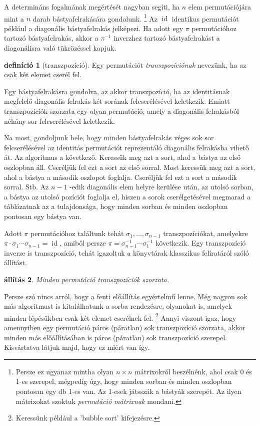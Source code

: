 \documentclass[a4paper, showtrims]{memoir}
\theoremstyle{plain}
\newtheorem{proposition}{állítás}[chapter]
\theoremstyle{remark}
\theoremstyle{definition}
\newtheorem{definition}[proposition]{definíció}
\DeclareMathOperator{\id}{id}
\begin{document}
A determináns fogalmának megértését nagyban segíti,
ha $n$ elem permutációjára mint a $n$ darab bástyafelrakására gondolunk.
\footnote{Persze ez ugyanaz mintha olyan $n\times n$ mátrixokról beszélnénk,
	ahol csak 0 és 1-es szerepel, mégpedig úgy, hogy minden sorban és minden oszlopban pontosan egy db 1-es van. Az 1-esek játsszák a bástyák szerepét. Az ilyen mátrixokat szoktuk \emph{permutáció mátrixnak} mondani.}
Az $\id$ identikus permutációt például a diagonális bástyafelrakás jelképezi.
Ha adott egy $\pi$ permutációhoz tartozó bástyafelrakás,
akkor a $\pi^{-1}$ inverzhez tartozó bástyafelrakást a diagonálisra való tükrözéssel kapjuk.
\begin{definition}[transzpozíció]
	Egy permutációt \emph{transzpozíciónak} nevezünk,
	ha az csak két elemet cserél fel.
\end{definition}
Egy bástyafelrakásra gondolva,
az akkor transzpozíció,
ha az identitásnak megfelelő diagonális felrakás két sorának felcserélésével keletkezik.
Emiatt transzpozíciók szorzata egy olyan permutáció,
amely a diagonális felrakásból néhány sor felcserélésével keletkezik.

Na most,
gondoljunk bele,
hogy minden bástyafelrakás véges sok sor felcserélésével az identitás permutációt reprezentáló diagonális felrakásba vihető át.
Az algoritmus a következő.
Keressük meg azt a sort,
ahol a bástya az első oszlopban áll.
Cseréljük fel ezt a sort az első sorral.
Most keressük meg azt a sort,
ahol a bástya a második oszlopot foglalja.
Cseréljük fel ezt a sort a második sorral.
Stb.
Az $n-1$ -edik diagonális elem helyre kerülése után, az utolsó sorban,
a bástya az utolsó pozíciót foglalja el,
hiszen a sorok cserélgetésével megmarad a táblázatnak az a tulajdonsága,
hogy minden sorban és minden oszlopban pontosan egy bástya van.

Adott $\pi$ permutációhoz találtunk tehát $\sigma_1,\ldots,\sigma_{n-1}$ transzpozíciókat,
amelyekre $\pi\cdot\sigma_1\cdots\sigma_{n-1}=\id$, amiből persze
$\pi=\sigma_{n-1}^{-1}\cdots\sigma_1^{-1}$ következik.
Egy transzpozíció inverze is transzpozíció, tehát igazoltuk a könyvtárak klasszikus felíratáról
szóló állítást.
\begin{proposition}
	Minden permutáció transzpozíciók szorzata.
\end{proposition}
Persze szó nincs arról, hogy a fenti előállítás egyértelmű lenne.
Még nagyon sok más algoritmust is kitalálhatunk a sorba rendezésre,
olyanokat is,
amelyek minden lépésükben csak két elemet cserélnek fel.%
\footnote{Keressünk például a 'bubble sort' kifejezésre.}
Annyi viszont igaz,
hogy amennyiben egy permutáció páros (páratlan) sok transzpozíció szorzata,
akkor minden más előállításában is páros (páratlan) sok transzpozíció szerepel.
Kisvártatva látjuk majd, hogy ez miért van így.
\end{document}
